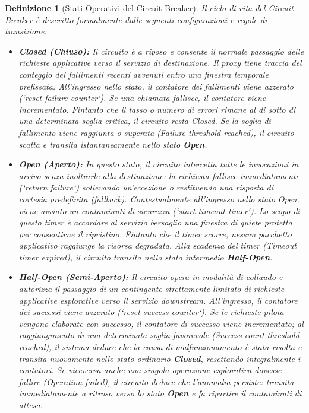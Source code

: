 \documentclass[11pt, a4paper]{article}
\newtheorem{theorem}{Definizione}
\begin{document}
\begin{theorem}[Stati Operativi del Circuit Breaker]
Il ciclo di vita del Circuit Breaker è descritto formalmente dalle seguenti configurazioni e regole di transizione:
\begin{itemize}
    \item \textbf{Closed (Chiuso):} Il circuito è a riposo e consente il normale passaggio delle richieste applicative verso il servizio di destinazione. Il proxy tiene traccia del conteggio dei fallimenti recenti avvenuti entro una finestra temporale prefissata. All'ingresso nello stato, il contatore dei fallimenti viene azzerato (`reset failure counter`). Se una chiamata fallisce, il contatore viene incrementato. Fintanto che il tasso o numero di errori rimane al di sotto di una determinata soglia critica, il circuito resta \emph{Closed}. Se la soglia di fallimento viene raggiunta o superata (\emph{Failure threshold reached}), il circuito scatta e transita istantaneamente nello stato \textbf{Open}.
    \item \textbf{Open (Aperto):} In questo stato, il circuito intercetta tutte le invocazioni in arrivo senza inoltrarle alla destinazione: la richiesta fallisce immediatamente (`return failure`) sollevando un'eccezione o restituendo una risposta di cortesia predefinita (\emph{fallback}). Contestualmente all'ingresso nello stato \emph{Open}, viene avviato un contaminuti di sicurezza (`start timeout timer`). Lo scopo di questo timer è accordare al servizio bersaglio una finestra di quiete protetta per consentirne il ripristino. Fintanto che il timer scorre, nessun pacchetto applicativo raggiunge la risorsa degradata. Alla scadenza del timer (\emph{Timeout timer expired}), il circuito transita nello stato intermedio \textbf{Half-Open}.
    \item \textbf{Half-Open (Semi-Aperto):} Il circuito opera in modalità di collaudo e autorizza il passaggio di un contingente strettamente limitato di richieste applicative esplorative verso il servizio downstream. All'ingresso, il contatore dei successi viene azzerato (`reset success counter`). Se le richieste pilota vengono elaborate con successo, il contatore di successo viene incrementato; al raggiungimento di una determinata soglia favorevole (\emph{Success count threshold reached}), il sistema deduce che la causa di malfunzionamento è stata risolta e transita nuovamente nello stato ordinario \textbf{Closed}, resettando integralmente i contatori. Se viceversa anche una singola operazione esplorativa dovesse fallire (\emph{Operation failed}), il circuito deduce che l'anomalia persiste: transita immediatamente a ritroso verso lo stato \textbf{Open} e fa ripartire il contaminuti di attesa.
\end{itemize}
\end{theorem}
\end{document}
